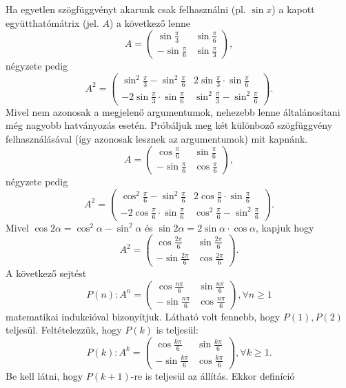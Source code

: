 \begin{solution}
Ha egyetlen szögfüggvényt akarunk csak felhasználni (pl. $\sin x$)
a kapott együtthatómátrix (jel. $A$) a következő lenne 
\[
A=\begin{pmatrix}\sin\frac{\pi}{3} & \sin\frac{\pi}{6}\\
-\sin\frac{\pi}{6} & \sin\frac{\pi}{3}
\end{pmatrix},
\]
négyzete pedig 
\[
A^{2}=\begin{pmatrix}\sin^{2}\frac{\pi}{3}-\sin^{2}\frac{\pi}{6} & 2\sin\frac{\pi}{3}\cdot\sin\frac{\pi}{6}\\
-2\sin\frac{\pi}{3}\cdot\sin\frac{\pi}{6} & \sin^{2}\frac{\pi}{3}-\sin^{2}\frac{\pi}{6}
\end{pmatrix}.
\]
Mivel nem azonosak a megjelenő argumentumok, nehezebb lenne általánosítani
még nagyobb hatványozás esetén. Próbáljuk meg két különboző szögfüggvény
felhasználásával (így azonosak lesznek az argumentumok) mit kapnánk.
\[
A=\begin{pmatrix}\cos\frac{\pi}{6} & \sin\frac{\pi}{6}\\
-\sin\frac{\pi}{6} & \cos\frac{\pi}{6}
\end{pmatrix},
\]
négyzete pedig 
\[
A^{2}=\begin{pmatrix}\cos^{2}\frac{\pi}{6}-\sin^{2}\frac{\pi}{6} & 2\cos\frac{\pi}{6}\cdot\sin\frac{\pi}{6}\\
-2\cos\frac{\pi}{6}\cdot\sin\frac{\pi}{6} & \cos^{2}\frac{\pi}{6}-\sin^{2}\frac{\pi}{6}
\end{pmatrix}.
\]
Mivel $\cos2\alpha=\cos^{2}\alpha-\sin^{2}\alpha$ és $\sin2\alpha=2\sin\alpha\cdot\cos\alpha$,
kapjuk hogy 
\[
A^{2}=\begin{pmatrix}\cos\frac{2\pi}{6} & \sin\frac{2\pi}{6}\\
-\sin\frac{2\pi}{6} & \cos\frac{2\pi}{6}
\end{pmatrix}.
\]
A következő sejtést 
\[
P(n):A^{n}=\begin{pmatrix}\cos\frac{n\pi}{6} & \sin\frac{n\pi}{6}\\
-\sin\frac{n\pi}{6} & \cos\frac{n\pi}{6}
\end{pmatrix},\forall n\geq1
\]
matematikai indukcióval bizonyítjuk. Látható volt fennebb, hogy $P(1),P(2)$
teljesül. Feltételezzük, hogy $P(k)$ is teljesül: 
\[
P(k):A^{k}=\begin{pmatrix}\cos\frac{k\pi}{6} & \sin\frac{k\pi}{6}\\
-\sin\frac{k\pi}{6} & \cos\frac{k\pi}{6}
\end{pmatrix},\forall k\geq1.
\]
Be kell látni, hogy $P(k+1)$-re is teljesül az állítás. Ekkor definíció

\end{solution}
